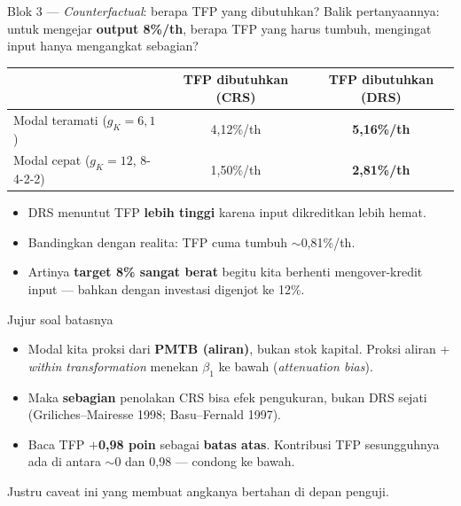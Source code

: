 \documentclass[aspectratio=169,11pt]{beamer}
\newcommand{\naik}[1]{{\color{hijau}\textbf{#1}}}
\newcommand{\key}[1]{{\color{aksen}\textbf{#1}}}
\begin{document}
\begin{frame}{Blok 3 --- \emph{Counterfactual}: berapa TFP yang dibutuhkan?}
  Balik pertanyaannya: untuk mengejar \key{output 8\%/th}, berapa TFP yang harus
  tumbuh, mengingat input hanya mengangkat sebagian?
  \vspace{0.3em}
  \begin{center}
  \renewcommand{\arraystretch}{1.25}
  \begin{tabular}{lcc}
    \toprule
    & \textbf{TFP dibutuhkan (CRS)} & \textbf{TFP dibutuhkan (DRS)}\\
    \midrule
    Modal teramati ($g_K=6{,}1$)      & 4,12\%/th & \key{5,16\%/th}\\
    Modal cepat ($g_K=12$, 8-4-2-2)   & 1,50\%/th & \key{2,81\%/th}\\
    \bottomrule
  \end{tabular}
  \end{center}
  \vspace{0.5em}
  \begin{itemize}
    \setlength\itemsep{0.4em}
    \item DRS menuntut TFP \key{lebih tinggi} karena input dikreditkan lebih hemat.
    \item Bandingkan dengan realita: TFP cuma tumbuh $\sim$0,81\%/th.
    \item Artinya \key{target 8\% sangat berat} begitu kita berhenti mengover-kredit input --- bahkan dengan investasi digenjot ke 12\%.
  \end{itemize}
\end{frame}

\begin{frame}{Jujur soal batasnya}
  \begin{itemize}
    \setlength\itemsep{0.8em}
    \item Modal kita proksi dari \key{PMTB (aliran)}, bukan stok kapital. Proksi
          aliran + \emph{within transformation} menekan $\beta_1$ ke bawah (\emph{attenuation bias}).
    \item Maka \textbf{sebagian} penolakan CRS bisa efek pengukuran, bukan DRS
          sejati (Griliches--Mairesse 1998; Basu--Fernald 1997).
    \item Baca TFP \naik{$+$0,98 poin} sebagai \key{batas atas}. Kontribusi TFP
          sesungguhnya ada di antara $\sim$0 dan 0,98 --- condong ke bawah.
  \end{itemize}
  \vfill
  {\color{abu}\small Justru caveat ini yang membuat angkanya bertahan di depan penguji.}
\end{frame}
\end{document}
